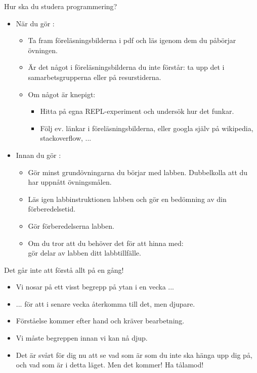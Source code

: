\begin{Slide}{Hur ska du studera programmering?}
\begin{itemize}
\item När du gör :
\begin{itemize}
\item Ta fram föreläsningsbilderna i pdf och läs igenom dem  du påbörjar övningen.
\item Är det något i föreläsningsbilderna du inte förstår: ta upp det i samarbetsgrupperna eller på resurstiderna.
\item Om något är knepigt:
\begin{itemize}
\item Hitta på egna REPL-experiment och undersök hur det funkar.
\item Följ ev. länkar i föreläsningsbilderna, eller googla själv på wikipedia, stackoverflow, ...
\end{itemize}
\end{itemize}

\item Innan du gör :
\begin{itemize}
\item Gör minst grundövningarna  du börjar med labben. Dubbelkolla att du har uppnått övningsmålen.
\item Läs igen  labbinstruktionen  labben och gör en bedömning av din förberedelsetid.
\item Gör förberedelserna  labben.
\item Om du tror att du behöver det för att hinna med: \\ gör delar av labben  ditt labbtillfälle.
\end{itemize}
\end{itemize}

\end{Slide}

\begin{Slide}{Det går inte att förstå allt på en gång!}
\begin{itemize}
\item Vi nosar på ett visst begrepp på ytan i en vecka ...

\item ... för att i senare vecka återkomma till det, men djupare.

\item Förståelse kommer efter hand och kräver bearbetning.

\item Vi måste  begreppen innan vi kan nå djup.

\pause\item Det är svårt för dig nu att se vad som är  som du inte ska hänga upp dig på, och vad som är  i detta läget. Men det kommer! Ha tålamod!
\end{itemize}

\end{Slide}


